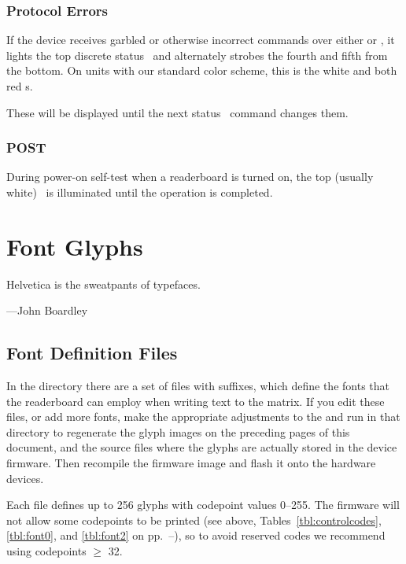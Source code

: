 \subsection{Protocol Errors}
If the device receives garbled or otherwise incorrect commands over either  or ,
it lights the top discrete status \led\ and alternately strobes the fourth and fifth from the bottom. On units with our
standard color scheme, this is the white and both red \led s. 

These will be displayed until the next status \led\ command changes them.

\subsection{POST}
During power-on self-test when a readerboard is turned on, the top (usually white) \led\ is illuminated until the  operation is completed.

%                               
\chapter{Font Glyphs}\label{chap:fonts}
\epigraph{Helvetica is the sweatpants of typefaces.}{---John Boardley}

\section{Font Definition Files}
In the  directory there are a set of files with  suffixes,
which define the fonts that the readerboard can employ when writing text to the matrix.
If you edit these files, or add more fonts, make the appropriate adjustments to the
 and run  in that directory to regenerate the glyph images on the
preceding pages of this document, and the source files where the glyphs are actually
stored in the device firmware. Then recompile the firmware image and flash it onto
the hardware devices.

Each file defines up to 256 glyphs with codepoint values 0--255. The firmware will not
allow some codepoints to be printed (see above, Tables~\ref{tbl:controlcodes}, \ref{tbl:font0}, and \ref{tbl:font2} on pp.~\pageref{tbl:controlcodes}--\pageref{tbl:font2}), so to avoid reserved codes we recommend using codepoints $\ge$ 32. 

